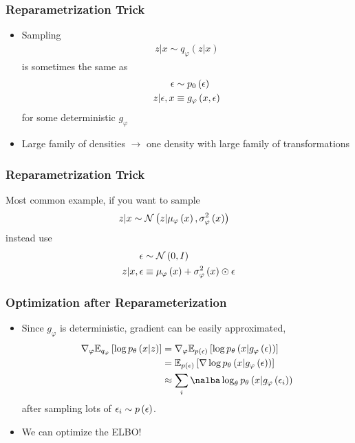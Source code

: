 \documentclass[10pt,mathserif]{beamer}
\begin{document}
\begin{frame}
  \frametitle{Reparametrization Trick}
  \begin{itemize}
  \item Sampling
  \begin{align*}
    z \vert x \sim q_{\varphi}\left(z \vert x\right)
  \end{align*}
  is sometimes the same as
  \begin{align*}
    \epsilon &\sim p_{0}\left(\epsilon\right) \\
    z \vert \epsilon, x &\equiv g_{\varphi}\left(x, \epsilon\right)
  \end{align*}
  for some deterministic $g_{\varphi}$
  \item Large family of densities $\rightarrow$ one density with large family of
    transformations
  \end{itemize}
\end{frame}

\begin{frame}
  \frametitle{Reparametrization Trick}
  Most common example, if you want to sample
  \begin{align*}
    z \vert x &\sim \mathcal{N}\left(z \vert \mu_{\varphi}\left(x\right), \sigma_{\varphi}^{2}\left(x\right)\right)
  \end{align*} 
  instead use
  \begin{align*}
    \epsilon &\sim \mathcal{N}\left(0, I\right) \\
    z \vert x, \epsilon &\equiv \mu_{\varphi}\left(x\right) + \sigma_{\varphi}^{2}\left(x\right) \odot \epsilon
  \end{align*}
\end{frame}

\begin{frame}
  \frametitle{Optimization after Reparameterization}
  \begin{itemize}
  \item Since $g_{\varphi}$ is deterministic, gradient can be easily
    approximated,
  \begin{align*}
    \nabla_{\varphi} \Esubarg{q_{\varphi}}{\log p_{\theta}\left(x \vert z\right)} &=
    \nabla_{\varphi} \Esubarg{p\left(\eps\right)}{\log p_{\theta}\left(x \vert g_{\varphi}\left(\eps\right)\right)} \\
    &= \Esubarg{p\left(\eps\right)}{\nabla \log p_{\theta}\left(x \vert g_{\varphi}\left(\eps\right)\right)} \\
      &\approx \sum_{i} \nalba \log_{\theta}p_{\theta}\left(x \vert g_{\varphi}\left(\eps_{i}\right)\right)
  \end{align*}
  after sampling lots of $\epsilon_{i} \sim p\left(\epsilon\right)$.
  \item We can optimize the ELBO!
  \end{itemize}
\end{frame}
\end{document}
